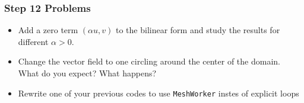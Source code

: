 \begin{frame}
  \frametitle{Step 12 Problems}

  \begin{itemize}
  \item Add a zero term $(\alpha u,v)$ to the bilinear form and study the results for different $\alpha > 0$.
  \item Change the vector field to one circling around the center of the domain. What do you expect? What happens?
  \item Rewrite one of your previous codes to use
    \lstinline!MeshWorker! instes of explicit loops
  \end{itemize}
\end{frame}
